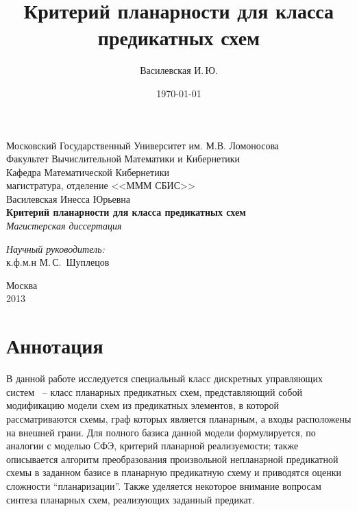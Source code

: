 \documentclass[12pt]{article}
\title{Критерий планарности для класса предикатных схем}
\author{Василевская И.\,Ю.}
\date{\today}
\begin{document}
    \begin{titlepage}
        \begin{center}
            Московский Государственный Университет им. М.В. Ломоносова\\
            Факультет Вычислительной Математики и Кибернетики\\
            Кафедра Математической Кибернетики\\
            магистратура, отделение <<МММ СБИС>>\\[6cm]

            \large {Василевская Инесса Юрьевна}\\
            \LARGE \textbf {Критерий планарности для класса предикатных схем}\\[0.8cm]
            \large \emph {Магистерская диссертация}\\[5.0cm]

            \begin{flushright}
                \large
                \begin{minipage}{0.40\textwidth}
                    \begin{flushleft}
                        \emph{Научный руководитель:}\\к.ф.м.н М.\,С.~Шуплецов
                    \end{flushleft}
                \end{minipage}
            \end{flushright}

            \vfill
            Москва\\
			2013
        \end{center}
    \end{titlepage}

\setcounter{page}{2}

\section{Аннотация}
\label{anno}
В данной работе исследуется специальный класс дискретных управляющих систем ~-- класс планарных предикатных схем, 
представляющий собой модификацию модели схем из предикатных элементов, в которой рассматриваются схемы,
граф которых является планарным, а входы расположены на внешней грани.
Для полного базиса данной модели формулируется, по аналогии с моделью СФЭ, критерий планарной
реализуемости; также описывается алгоритм преобразования произвольной непланарной предикатной схемы 
в заданном базисе в планарную предикатную схему и приводятся оценки сложности ``планаризации''.
Также уделяется некоторое внимание вопросам синтеза планарных схем, реализующих заданный предикат.
\clearpage
\end{document}

